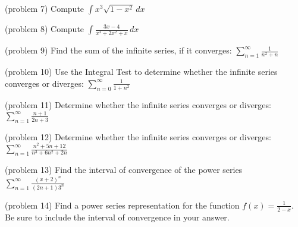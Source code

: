 \documentclass[handout]{ximera}
\begin{document}
\begin{problem}(problem 7)
Compute $\displaystyle \int x^3 \sqrt{1-x^2} \, dx$

\end{problem}


\begin{problem}(problem 8)
Compute $\displaystyle \int \frac{3x-4}{x^3 +2x^2 +x} \, dx$

\end{problem}



\begin{problem}(problem 9)
Find the sum of the infinite series, if it converges: $\displaystyle\sum_{n=1}^\infty \frac{1}{n^2 +n}$

\end{problem}




\begin{problem}(problem 10)
Use the Integral Test to determine whether the infinite series converges or diverges:  $\displaystyle \sum_{n=0}^\infty \frac{1}{1+n^2}$

\end{problem}

\begin{problem}(problem 11)
Determine whether the infinite series converges or diverges: $\displaystyle \sum_{n=1}^\infty \frac{n+1}{2n+3}$

\end{problem}





\begin{problem}(problem 12)
Determine whether the infinite series converges or diverges: $\displaystyle \sum_{n=1}^\infty \frac{n^2 + 5n + 12}{n^3 + 6n^2 + 2n}$

\end{problem}



\begin{problem}(problem 13)
Find the interval of convergence of the power series $\displaystyle{\sum_{n=1}^\infty \frac{(x+2)^n}{(2n+1)3^n}}$

\end{problem}


\begin{problem}(problem 14)
Find a power series representation for the function
$ \displaystyle f(x) = \frac{1}{2-x} $. Be sure to include the interval of convergence in your answer.

\end{problem}
\end{document}
